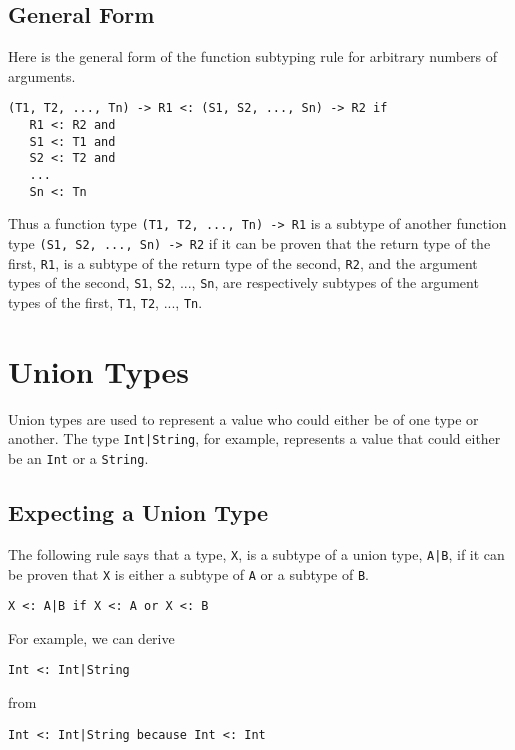 \documentclass[10pt,oneside]{book}
\begin{document}
\subsection*{General Form}
Here is the general form of the function subtyping rule for arbitrary numbers of arguments.
\begin{lstlisting}
(T1, T2, ..., Tn) -> R1 <: (S1, S2, ..., Sn) -> R2 if
   R1 <: R2 and
   S1 <: T1 and
   S2 <: T2 and
   ...
   Sn <: Tn
\end{lstlisting}
Thus a function type \texttt{\frenchspacing (T1, T2, ..., Tn) -> R1} is a subtype of another function type \texttt{\frenchspacing (S1, S2, ..., Sn) -> R2} if it can be proven that the return type of the first, \texttt{\frenchspacing R1}, is a subtype of the return type of the second, \texttt{\frenchspacing R2}, and the argument types of the second, \texttt{\frenchspacing S1}, \texttt{\frenchspacing S2}, ..., \texttt{\frenchspacing Sn}, are respectively subtypes of the argument types of the first, \texttt{\frenchspacing T1}, \texttt{\frenchspacing T2}, ..., \texttt{\frenchspacing Tn}.

\section{Union Types}
Union types are used to represent a value who could either be of one type or another. The type \texttt{\frenchspacing Int|String}, for example, represents a value that could either be an \texttt{\frenchspacing Int} or a \texttt{\frenchspacing String}.

\subsection*{Expecting a Union Type}
The following rule says that a type, \texttt{\frenchspacing X}, is a subtype of a union type, \texttt{\frenchspacing A|B}, if it can be proven that \texttt{\frenchspacing X} is either a subtype of \texttt{\frenchspacing A} or a subtype of \texttt{\frenchspacing B}.
\begin{lstlisting}
X <: A|B if X <: A or X <: B
\end{lstlisting}

For example, we can derive
\begin{lstlisting}
Int <: Int|String
\end{lstlisting}
from
\begin{lstlisting}
Int <: Int|String because Int <: Int
\end{lstlisting}
\end{document}
